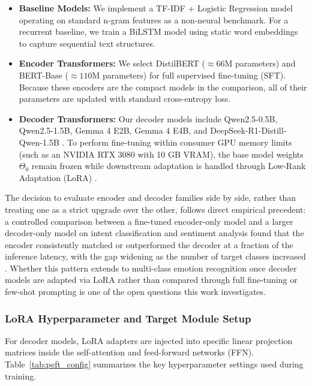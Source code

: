 \documentclass[conference]{IEEEtran}
\begin{document}
\begin{itemize}
    \item \textbf{Baseline Models:} We implement a TF-IDF + Logistic Regression model operating on standard n-gram features as a non-neural benchmark. For a recurrent baseline, we train a BiLSTM model using static word embeddings to capture sequential text structures.
    \item \textbf{Encoder Transformers:} We select DistilBERT ($\approx 66\text{M}$ parameters) and BERT-Base ($\approx 110\text{M}$ parameters) for full supervised fine-tuning (SFT). Because these encoders are the compact models in the comparison, all of their parameters are updated with standard cross-entropy loss.
    \item \textbf{Decoder Transformers:} Our decoder models include Qwen2.5-0.5B, Qwen2.5-1.5B, Gemma 4 E2B, Gemma 4 E4B, and DeepSeek-R1-Distill-Qwen-1.5B \cite{gemmateam2026gemma4}. To perform fine-tuning within consumer GPU memory limits (such as an NVIDIA RTX 3080 with 10 GB VRAM), the base model weights $\Theta_0$ remain frozen while downstream adaptation is handled through Low-Rank Adaptation (LoRA) \cite{nwaiwu2025peft}.
\end{itemize}

The decision to evaluate encoder and decoder families side by side, rather than treating one as a strict upgrade over the other, follows direct empirical precedent: a controlled comparison between a fine-tuned encoder-only model and a larger decoder-only model on intent classification and sentiment analysis found that the encoder consistently matched or outperformed the decoder at a fraction of the inference latency, with the gap widening as the number of target classes increased \cite{benayas2025comparative}. Whether this pattern extends to multi-class emotion recognition once decoder models are adapted via LoRA rather than compared through full fine-tuning or few-shot prompting is one of the open questions this work investigates.

\subsubsection{LoRA Hyperparameter and Target Module Setup}
For decoder models, LoRA adapters are injected into specific linear projection matrices inside the self-attention and feed-forward networks (FFN). 
Table~\ref{tab:peft_config} summarizes the key hyperparameter settings used during training.
\end{document}

